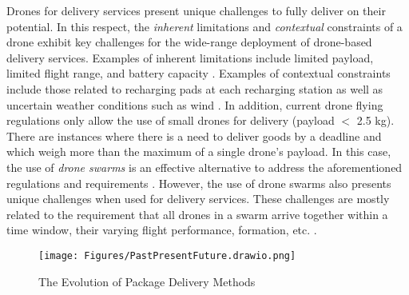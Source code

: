 \documentclass[conference]{IEEEtran}
\begin{document}
Drones for delivery services present unique challenges to fully deliver on their potential. In this respect, the \textit{inherent} limitations and \textit{contextual} constraints of a drone exhibit key challenges for the wide-range deployment of drone-based delivery services. Examples of inherent limitations include limited payload, limited flight range, and battery capacity \cite{jermaine2021demo}. Examples of contextual constraints include those related to recharging pads at each recharging station as well as uncertain weather conditions such as wind \cite{alkouz2021provider}. In addition, current drone flying regulations only allow the use of small drones for delivery (payload $<$ 2.5 kg). There are instances where there is a need to deliver goods by a deadline and which weigh more than the maximum of a single drone’s payload. In this case, the use of \textit{drone swarms} is an effective alternative to address the aforementioned regulations and requirements \cite{alkouz2020swarm}. However, the use of drone swarms also presents unique challenges when used for delivery services. These challenges are mostly related to the requirement that all drones in a swarm arrive together within a time window, their varying flight performance, formation, etc. \cite{alkouz2020formation}.

\begin{figure} [tp!]
    \centering
    \texttt{[image: Figures/PastPresentFuture.drawio.png]}
    \caption{The Evolution of Package Delivery Methods}
    \label{pastpresentfuture}
\end{figure}
\end{document}
